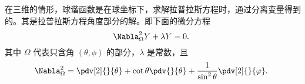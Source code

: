 

在三维的情形，球谐函数是在球坐标下，求解拉普拉斯方程时，通过分离变量得到的。其是拉普拉斯方程角度部分的解。即下面的微分方程
\begin{equation}
\Nabla_\Omega^2 Y+\lambda Y=0.~
\end{equation}
其中 $\Omega$ 代表只含角 $(\theta,\phi)$ 的部分，$\lambda$ 是常数，且
\begin{equation}
\Nabla^2_\Omega=\pdv[2]{}{\theta}+\cot\theta\pdv{}{\theta}+\frac{1}{\sin^2\theta}\pdv[2]{}{\varphi}.~
\end{equation}











